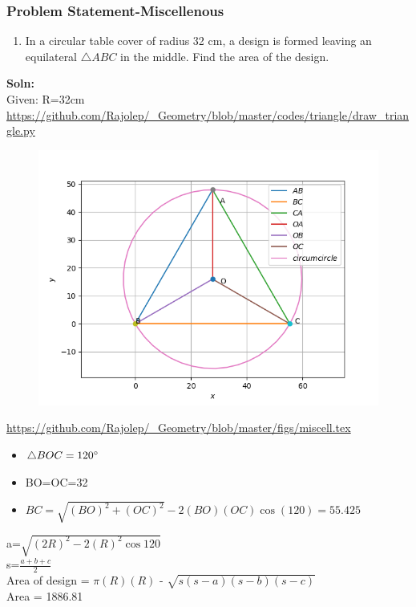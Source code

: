 \begin{frame}
\frametitle{Problem Statement-Miscellenous}
\begin{enumerate}[label=(\roman*)]
\item In a circular table cover of radius 32 cm, a design is formed leaving an equilateral $\triangle{ABC}$
in the middle. Find the area of the design.\\
\end{enumerate}
\textbf{Soln:}\\
  Given: R=32cm\\
\url{https://github.com/Rajolep/_Geometry/blob/master/codes/triangle/draw_triangle.py}
\begin{figure}
\includegraphics[scale=0.3]{./figs/misc.png}
\end{figure}
\end{frame}
\begin{frame}
\url{https://github.com/Rajolep/_Geometry/blob/master/figs/miscell.tex}
\begin{figure}

\end{figure}
\begin{itemize}
\item $\triangle{BOC} = 120\degree$ \\
\item BO=OC=32\\
\item $BC=\sqrt{(BO)^2+(OC)^2}-2(BO)(OC)\cos(120)=55.425$\\
\end{itemize}
a=$\sqrt{(2R)^2-2(R)^2\cos{120}}$\\
s=$\frac{a+b+c}{2}$\\
Area of design = $\pi(R)(R)$ - $\sqrt{s(s-a)(s-b)(s-c)}$\\
Area = 1886.81
\end{frame}